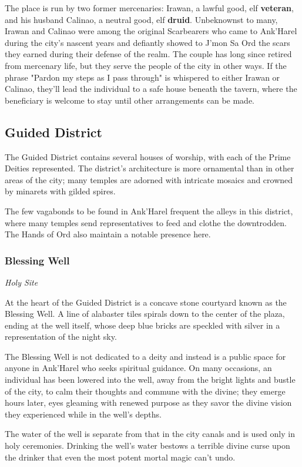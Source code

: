 \documentclass[10pt,a4paper,twoside,fancy,bg=print,twocolumn,openany,nodeprecatedcode]{dndbook}
\begin{document}
The place is run by two former mercenaries: Irawan, a lawful good, elf \textbf{veteran}, and his husband Calinao, a neutral good, elf \textbf{druid}. Unbeknownst to many, Irawan and Calinao were among the original Scarbearers who came to Ank'Harel during the city's nascent years and defiantly showed to J'mon Sa Ord the scars they earned during their defense of the realm. The couple has long since retired from mercenary life, but they serve the people of the city in other ways. If the phrase "Pardon my steps as I pass through" is whispered to either Irawan or Calinao, they'll lead the individual to a safe house beneath the tavern, where the beneficiary is welcome to stay until other arrangements can be made.

\subsection{Guided District}
The Guided District contains several houses of worship, with each of the Prime Deities represented. The district's architecture is more ornamental than in other areas of the city; many temples are adorned with intricate mosaics and crowned by minarets with gilded spires.

The few vagabonds to be found in Ank'Harel frequent the alleys in this district, where many temples send representatives to feed and clothe the downtrodden. The Hands of Ord also maintain a notable presence here.

\subsubsection{Blessing Well}
\textit{Holy Site}

At the heart of the Guided District is a concave stone courtyard known as the Blessing Well. A line of alabaster tiles spirals down to the center of the plaza, ending at the well itself, whose deep blue bricks are speckled with silver in a representation of the night sky.

The Blessing Well is not dedicated to a deity and instead is a public space for anyone in Ank'Harel who seeks spiritual guidance. On many occasions, an individual has been lowered into the well, away from the bright lights and bustle of the city, to calm their thoughts and commune with the divine; they emerge hours later, eyes gleaming with renewed purpose as they savor the divine vision they experienced while in the well's depths.

The water of the well is separate from that in the city canals and is used only in holy ceremonies. Drinking the well's water bestows a terrible divine curse upon the drinker that even the most potent mortal magic can't undo.
\end{document}
